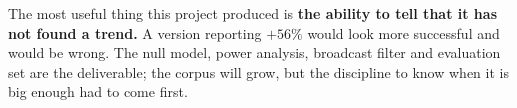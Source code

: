 \documentclass[10pt]{article}
\begin{document}
\vspace{0.3em}
\begin{keybox}
The most useful thing this project produced is \textbf{the ability to tell that
it has not found a trend.} A version reporting  $+56\%$ would
look more successful and would be wrong. The null model, power analysis,
broadcast filter and evaluation set are the deliverable; the corpus will grow,
but the discipline to know when it is big enough had to come first.
\end{keybox}
\end{document}
